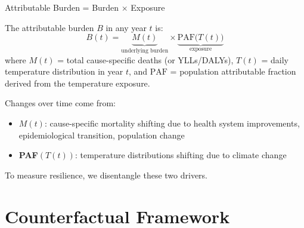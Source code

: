 \documentclass[aspectratio=169,10pt]{beamer}
\begin{document}
\begin{frame}{Attributable Burden = Burden $\times$ Exposure}

  The attributable burden $B$ in any year $t$ is:
  \begin{equation*}
    B(t) = \underbrace{M(t)}_{\text{underlying burden}} \times \underbrace{\text{PAF}\bigl(T(t)\bigr)}_{\text{exposure}}
  \end{equation*}
  where $M(t)$ = total cause-specific deaths (or YLLs/DALYs), $T(t)$ = daily temperature distribution in year $t$, and $\text{PAF}$ = population attributable fraction derived from the temperature exposure.

  \vspace{0.3em}
  Changes over time come from:
  \begin{itemize}
    \item \textbf{$M(t)$}: cause-specific mortality shifting due to health system improvements, epidemiological transition, population change
    \item \textbf{PAF$(T(t))$}: temperature distributions shifting due to climate change
  \end{itemize}

  \vspace{0.5em}
  To measure resilience, we \alert{disentangle} these two drivers.
\end{frame}

\section{Counterfactual Framework}
\end{document}
